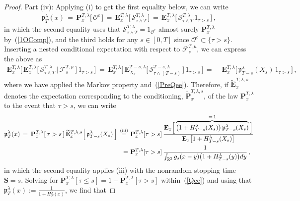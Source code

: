 \documentclass[10pt]{article}
\def\stackrel#1#2{\mathrel{\mathop{#2}\limits^{#1}}}
\numberwithin{equation}{section}
\theoremstyle{definition}
\newcommand{\R}{{\mathbb R}}
\begin{document}
\begin{proof}
\noindent  Part (iv):  Applying (i) to get the first equality below,  we can write 
\begin{align}\label{PreQee}
 \mathfrak{p}_{T}^{\lambda}( x)  \,=\,  \mathbf{P}_{x  }^{T,\lambda}\big[\, \mathcal{O}^c\,\big]    \,=\,\mathbf{E}_{x  }^{T,\lambda}\Big[\, \mathcal{S}_{\tau\wedge T }^{T,\lambda}\, \Big] \,=\,  \mathbf{E}_{x  }^{T,\lambda}\Big[ \,\mathcal{S}_{\tau \wedge T}^{T,\lambda}\, 1_{\tau > s }\,\Big] \,,
 \end{align}
 in which the second equality uses  that $\mathcal{S}_{\tau\wedge T}^{T,\lambda}=1_{\mathcal{O}^c}$ almost surely $\mathbf{P}_{x  }^{T,\lambda}$ by~(\ref{1OComp}), and the third holds  for any $s\in [0,T]$ since ${\mathcal{O}^c} \subset \{\tau > s \}$. Inserting a nested conditional expectation with respect to $\mathscr{F}_s^{T,\mu}$, we can express the above as
 \begin{align}\label{Qee}
 \mathbf{E}_{x }^{T,\lambda }\Big[ \,\mathbf{E}_{x  }^{T,\lambda}\Big[\,\mathcal{S}_{\tau\wedge T}^{T,\lambda} \,\Big|\,\mathscr{F}_s^{T,\mu}\,\Big] \, 1_{ \tau > s  }\,\Big] \nonumber
\,=\,\mathbf{E}_{x  }^{T,\lambda}\Big[ \,\mathbf{E}_{X_s  }^{T-s,\lambda}\Big[\,\mathcal{S}_{\tau\wedge (T-s)}^{T-s,\lambda} \,\Big]\, 1_{ \tau  > s  }\,\Big] 
\,=\,&\,\mathbf{E}_{x  }^{T,\lambda}\Big[\, \mathfrak{p}_{T-s}^{\lambda}( X_s)  \,  1_{\tau > s   }\,\Big] \,,
\end{align}
where  we have  applied the Markov property and~(\ref{PreQee}).
Therefore, if $\mathbf{\widetilde{E}}_{x }^{T,\lambda,s }$ denotes the expectation corresponding to the conditioning, $\mathbf{\widetilde{P}}_{x }^{T,\lambda,s }$, of the law  $\mathbf{P}_{x  }^{T,\lambda}$ to the event that $\tau > s$, we can write
\begin{align}
\mathfrak{p}_{T}^{\lambda}( x)\,=\,\mathbf{P}_{x  }^{T,\lambda}[ \,\tau > s  \, ] \,  \mathbf{\widetilde{E}}_{x }^{T,\lambda,s }\Big[\, \mathfrak{p}_{T-s}^{\lambda}( X_s)  \,\Big]
\,\stackrel{\textup{(iii)}}{=}\,&\,\mathbf{P}_{x }^{T,\lambda }[ \tau > s  ] \,  \frac{ \mathbf{E}_{x }\Big[\overbrace{\big(1+H^{\lambda}_{T-s}(X_s)   \big)\, \mathfrak{p}_{T-s}^{\lambda}( X_s) }^{=\,1} \Big]  }{ \mathbf{E}_{x }\big[1+H^{\lambda}_{T-s}(X_s)     \big]}\nonumber \\
\,=\,&\, \mathbf{P}_{x }^{T,\lambda }[ \tau > s  ] \,  \frac{ 1  }{ \int_{\R^2}g_{s}(x-y) \big( 1+H^{\lambda}_{T-s}(y) \big)  dy } \,,
\end{align}
 in which the second equality applies  (iii) with the nonrandom stopping time $\mathbf{S}=s$.  Solving for $\mathbf{P}_{x }^{T,\lambda }[ \tau \leq  s  ]=1- \mathbf{P}_{x }^{T,\lambda }[ \tau > s  ] $ within~(\ref{Qee}) and using that $\mathfrak{p}_{T}^{\lambda}( x):=\frac{1}{1 +H_T^{\lambda}(x)  }$, we find that

\end{proof}
\end{document}
